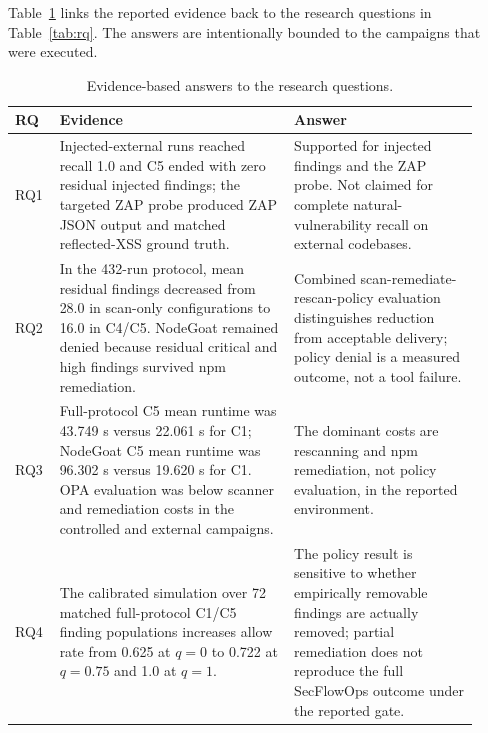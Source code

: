 Table~\ref{tab:rq-answers} links the reported evidence back to the research questions in Table~\ref{tab:rq}. The answers are intentionally bounded to the campaigns that were executed.

\begin{table}[t]
\centering
\footnotesize
\caption{Evidence-based answers to the research questions.}
\label{tab:rq-answers}
\begin{tabular}{@{}p{0.08\linewidth}p{0.47\linewidth}p{0.37\linewidth}@{}}
\toprule
RQ & Evidence & Answer \\
\midrule
RQ1 & Injected-external runs reached recall 1.0 and C5 ended with zero residual injected findings; the targeted ZAP probe produced ZAP JSON output and matched reflected-XSS ground truth. & Supported for injected findings and the ZAP probe. Not claimed for complete natural-vulnerability recall on external codebases. \\
RQ2 & In the 432-run protocol, mean residual findings decreased from 28.0 in scan-only configurations to 16.0 in C4/C5. NodeGoat remained denied because residual critical and high findings survived npm remediation. & Combined scan-remediate-rescan-policy evaluation distinguishes reduction from acceptable delivery; policy denial is a measured outcome, not a tool failure. \\
RQ3 & Full-protocol C5 mean runtime was 43.749 s versus 22.061 s for C1; NodeGoat C5 mean runtime was 96.302 s versus 19.620 s for C1. OPA evaluation was below scanner and remediation costs in the controlled and external campaigns. & The dominant costs are rescanning and npm remediation, not policy evaluation, in the reported environment. \\
RQ4 & The calibrated simulation over 72 matched full-protocol C1/C5 finding populations increases allow rate from 0.625 at $q=0$ to 0.722 at $q=0.75$ and 1.0 at $q=1$. & The policy result is sensitive to whether empirically removable findings are actually removed; partial remediation does not reproduce the full SecFlowOps outcome under the reported gate. \\
\bottomrule
\end{tabular}
\end{table}
